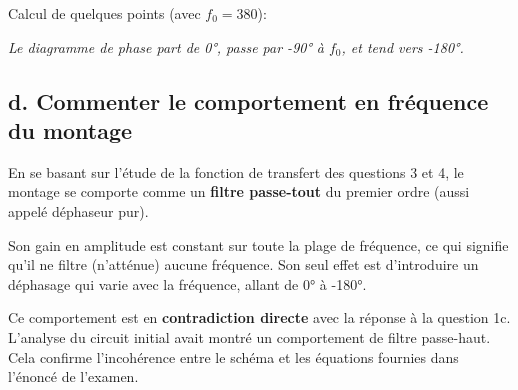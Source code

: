 \documentclass[12pt,a4paper]{article}
\begin{document}
Calcul de quelques points (avec \(f_0 = 380\)):
\begin{center}
\end{center}

\begin{center}
    \textit{Le diagramme de phase part de 0°, passe par -90° à \(f_0\), et tend vers -180°.}
\end{center}

\subsection*{d. Commenter le comportement en fréquence du montage}
En se basant sur l'étude de la fonction de transfert des questions 3 et 4, le montage se comporte comme un \textbf{filtre passe-tout} du premier ordre (aussi appelé déphaseur pur).

Son gain en amplitude est constant sur toute la plage de fréquence, ce qui signifie qu'il ne filtre (n'atténue) aucune fréquence. Son seul effet est d'introduire un déphasage qui varie avec la fréquence, allant de 0° à -180°.

Ce comportement est en \textbf{contradiction directe} avec la réponse à la question 1c. L'analyse du circuit initial avait montré un comportement de filtre passe-haut. Cela confirme l'incohérence entre le schéma et les équations fournies dans l'énoncé de l'examen.
\end{document}
